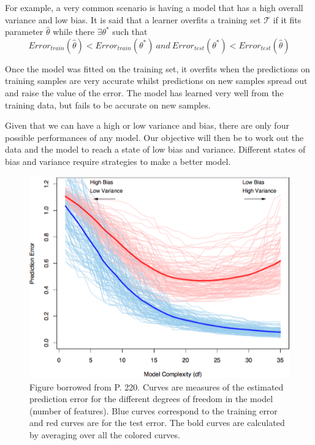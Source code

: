 For example, a very common scenario is having a model that has a high overall variance and low bias.
It is said that a learner overfits a training set $\mathcal{T}$ if it fits parameter $\hat{\theta}$ while there $\exists \theta^*$ such that
\begin{equation} \label{eq:overfitting}
Error_{train}(\hat{\theta}) < Error_{train}(\theta^*) \ and \ Error_{test}(\theta^*) < Error_{test}(\hat{\theta})
\end{equation}

Once the model was fitted on the training set, it overfits when the predictions on training samples are very accurate whilst predictions on new samples spread out and raise the value of the error. The model has learned very well from the training data, but fails to be accurate on new samples.

Given that we can have a high or low variance and bias, there are only four possible performances of any model. Our objective will then be to work out the data and the model to reach a state of low bias and variance. Different states of bias and variance require strategies to make a better model.



\begin{figure}[h!]
\begin{center}
\includegraphics[width=0.7\columnwidth]{figures/figure-biasVariance/figure-biasVariance}
\caption{\label{figure-biasVariance} Figure borrowed from \protect\textcite{hastie-elemstatslearn} P. 220. Curves are measures of the estimated prediction error for the different degrees of freedom in the model (number of features). Blue curves correspond to the training error and red curves are for the test error. The bold curves are calculated by averaging over all the colored curves.%
}
\end{center}
\end{figure}

